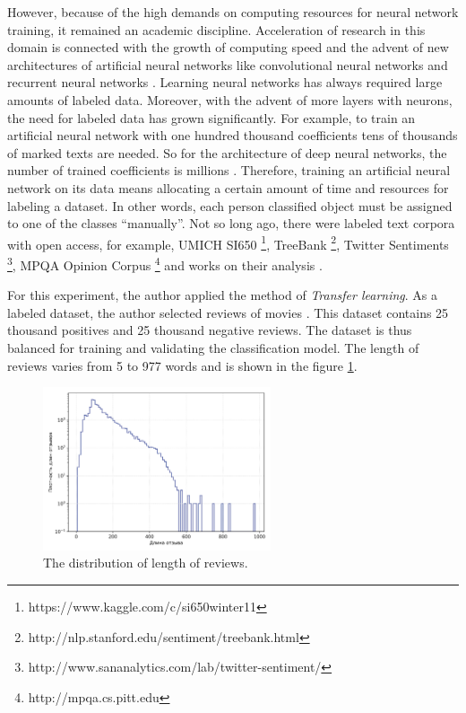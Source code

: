 \documentclass[12pt]{report}
\theoremstyle{definition}
\begin{document}
However, because of the high demands on computing resources for neural network training, it remained an academic discipline.
Acceleration of research in this domain is connected with the growth of computing speed and the advent of new architectures of artificial neural networks like convolutional neural networks \cite{kim2014convolutional} and recurrent neural networks \cite{mikolov2010recurrent}.
Learning neural networks has always required large amounts of labeled data.
Moreover, with the advent of more layers with neurons, the need for labeled data has grown significantly. 
For example, to train an artificial neural network with one hundred thousand coefficients tens of thousands of marked texts are needed. 
So for the architecture of deep neural networks, the number of trained coefficients is millions \cite{krizhevsky2012imagenet, miller1995wordnet}.
Therefore, training an artificial neural network on its data means allocating a certain amount of time and resources for labeling a dataset. 
In other words, each person classified object must be assigned to one of the classes ``manually''.
Not so long ago, there were labeled text corpora with open access, for example,
UMICH SI650 \footnote{https://www.kaggle.com/c/si650winter11}, TreeBank \footnote{http://nlp.stanford.edu/sentiment/treebank.html}, 
Twitter Sentiments \footnote{http://www.sananalytics.com/lab/twitter-sentiment/}, MPQA Opinion Corpus \footnote{http://mpqa.cs.pitt.edu} and works on their analysis \cite{maas2011learning, socher2013recursive, akkaya2009subjectivity}.

For this experiment, the author applied the method of \textit{Transfer learning}.
As a labeled dataset, the author selected reviews of movies \cite{maas2011learning}. 
This dataset contains 25 thousand positives and 25 thousand negative reviews. 
The dataset is thus balanced for training and validating the classification model.
The length of reviews varies from 5 to 977 words and is shown in the figure \ref{fig:op4_2}.

\begin{figure}[ht]
	\centering
	\includegraphics[width=0.6\textwidth]{op4_2}
	\caption{The distribution of length of reviews.}
	\label{fig:op4_2}
\end{figure}
\end{document}
